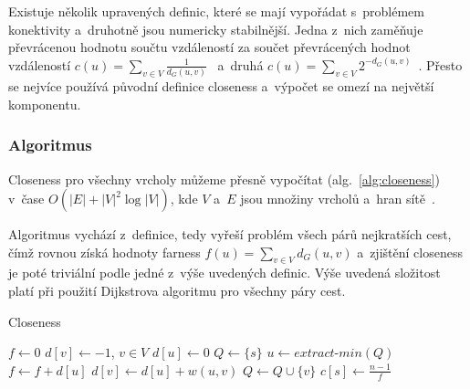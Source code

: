 \documentclass{bakalarka}
\begin{document}
Existuje několik upravených definic, které se mají vypořádat s~problémem
konektivity a~druhotně jsou numericky stabilnější. Jedna z~nich zaměňuje
převrácenou hodnotu součtu vzdáleností za součet převrácených hodnot
vzdáleností $c(u) = \sum_{v \in V} \frac{1}{d_G(u, v)}$~\citep{opsahl} a~druhá
$c(u) = \sum_{v \in V} 2^{-d_G(u, v)}$~\citep{dangalchev2006}. Přesto se
nejvíce používá původní definice closeness a~výpočet se omezí na největší
komponentu.


\subsubsection{Algoritmus}
Closeness pro všechny vrcholy můžeme přesně vypočítat
(alg.~\ref{alg:closeness}) v~čase $O(|E| + |V|^2\log|V|)$, kde $V$ a~$E$ jsou
množiny vrcholů a~hran sítě~\citep{fredmantarjan}.

Algoritmus vychází z~definice, tedy vyřeší problém všech párů nejkratších cest,
čímž rovnou získá hodnoty farness $f(u) = \sum_{v \in V} d_G(u, v)$ a~zjištění
closeness je poté triviální podle jedné z~výše uvedených definic. Výše uvedená
složitost platí při použití Dijkstrova algoritmu pro všechny páry cest.

\begin{center}
\begin{minipage}{\textwidth}
\begin{algorithm}[H]
	\caption{Closeness}
		\label{alg:closeness}

	\begin{algorithmic}[1]
	\Statex
		\State $f \gets 0$
		\State $d[v] \gets -1$, $v \in V$
		\State $d[u] \gets 0$
		\State $Q \gets \{s\}$
			\State $u \gets extract\mbox{-}min(Q)$
			\State $f \gets f + d[u]$
					\State $d[v] \gets d[u] + w(u, v)$
					\State $Q \gets Q \cup \{v\}$
				\EndIf
			\EndFor
		\EndWhile
		\State $c[s] \gets \frac{n - 1}{f}$
	\EndFor
	\end{algorithmic}
\end{algorithm}
\end{minipage}
\end{center}
\mbox{}
\end{document}
